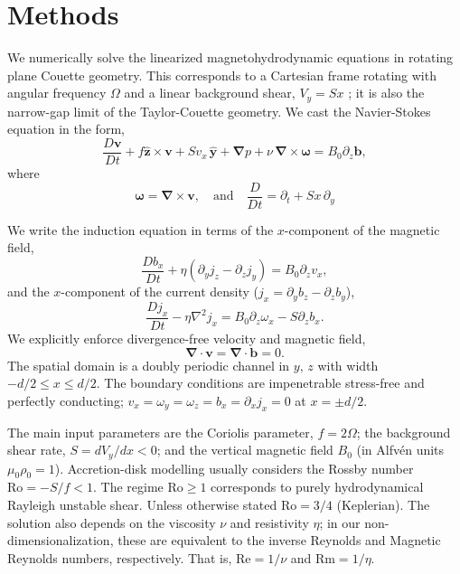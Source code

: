 \documentclass{rsproca_new}%
\newcommand{\Reyn}{\mathrm{Re}}
\newcommand{\Reym}{\mathrm{Rm}}
\newcommand{\Ro}{\mathrm{Ro}}
\begin{document}
\section{Methods}
\label{sec:methods}

We numerically solve the linearized magnetohydrodynamic equations in rotating plane Couette geometry.
This corresponds to a Cartesian frame rotating with angular frequency $\Omega$ and a linear background shear, $V_{y}=Sx$ \cite{2015RSPSA.47140699V}; it is also the narrow-gap limit of the Taylor-Couette geometry.
We cast the Navier-Stokes equation in the form,
\begin{equation}\label{eq:mhd}
\frac{D \boldsymbol{v}}{Dt}+f \boldsymbol{\hat{z}}\times\boldsymbol{v}+{S}v_{x}\,\boldsymbol{\hat{y}}+\boldsymbol{\nabla}{p}+\nu\,\boldsymbol{\nabla}\times\boldsymbol{\omega}=B_{0}\partial_{z}\boldsymbol{b},
\end{equation}
where
\begin{equation}
\boldsymbol{\omega}=\boldsymbol{\nabla}\times\boldsymbol{v},\quad\text{and}\quad\frac{D}{Dt}=\partial_{t}+{S}x\,\partial_{y}\end{equation}

We write the induction equation in terms of the $x$-component of the magnetic field,
\begin{equation}\label{eq:Bx}
\frac{Db_{x}}{Dt}+\eta(\partial_{y}j_{z}-\partial_{z}j_{y})=B_{0}\partial_{z}v_{x},
\end{equation}
and the $x$-component of the current density ($j_{x}=\partial_{y}b_{z}-\partial_{z}b_{y}$),
\begin{equation}\label{eq:Jx}
\frac{Dj_{x}}{Dt}-\eta\nabla^{2}j_{x}=B_{0}\partial_{z}\omega_{x}-S\partial_{z}b_{x}.
\end{equation}
We explicitly enforce divergence-free velocity and magnetic field,
\begin{equation}\label{eq:divu}
 \boldsymbol{\nabla}\cdot\boldsymbol{v}=\boldsymbol{\nabla}\cdot\boldsymbol{b}=0.
\end{equation}
The spatial domain is a doubly periodic channel in $y,\,z$ with width $-d/2\le{x}\le d/2$.
The boundary conditions are impenetrable stress-free and perfectly conducting; $v_{x}=\omega_{y}=\omega_{z}=b_{x}=\partial_{x}j_{x}=0$ at $x=\pm{d/2}$. 

The main input parameters are the Coriolis parameter, $f=2 \Omega$; the background shear rate, $S=dV_{y}/dx<0$; and the vertical magnetic field $B_{0}$ (in Alfv\'{e}n units $\mu_{0}\rho_{0}=1$).
Accretion-disk modelling usually considers the Rossby number $\Ro=-S/f<1$. 
The regime $\Ro\ge1$ corresponds to purely hydrodynamical Rayleigh unstable shear.
Unless otherwise stated $\Ro=3/4$ (Keplerian).
The solution also depends on the viscosity $\nu$ and resistivity $\eta$; in our non-dimensionalization, these are equivalent to the inverse Reynolds and Magnetic Reynolds numbers, respectively.
That is, $\Reyn = 1/\nu$ and $\Reym = 1/\eta$.
\end{document}
